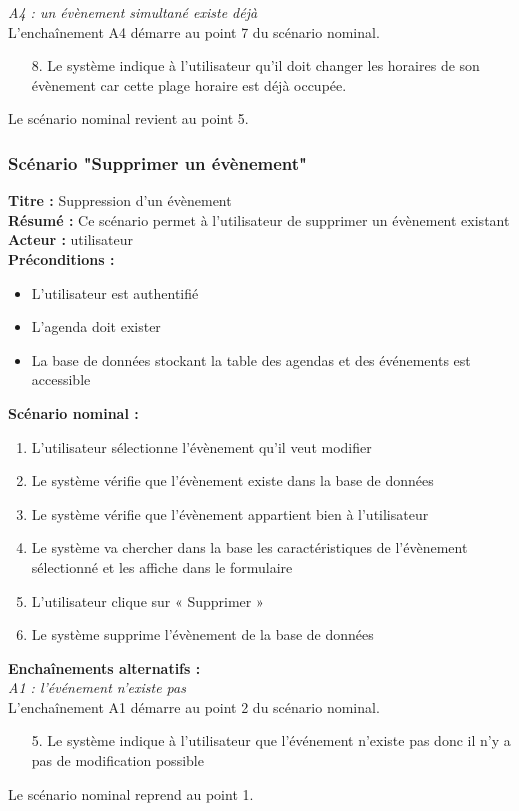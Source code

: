 \documentclass[12pt , a4paper]{article}
\begin{document}
\noindent\textit{A4 : un évènement simultané existe déjà}\\
L’enchaînement A4 démarre au point 7 du scénario nominal.
\begin{enumerate}
\item[8.] Le système indique à l’utilisateur qu’il doit changer les horaires de son évènement car cette plage horaire est déjà occupée.
\end{enumerate}
Le scénario nominal revient au point 5.\\




\newpage
\subsubsection{Scénario "Supprimer un évènement"}
\noindent\textbf{Titre : } Suppression d’un évènement\\
\textbf{Résumé : } Ce scénario permet à l’utilisateur de supprimer un évènement existant\\
\textbf{Acteur : }utilisateur\\

\noindent\textbf{Préconditions :}
\begin{itemize}
\item L’utilisateur est authentifié
\item L'agenda doit exister
\item La base de données stockant la table des agendas et des événements est accessible\\
\end{itemize}


\noindent\textbf{Scénario nominal :}
\begin{enumerate}
\item L’utilisateur sélectionne l’évènement qu’il veut modifier
\item Le système vérifie que l’évènement existe dans la base de données
\item Le système vérifie que l’évènement appartient bien à l’utilisateur
\item Le système va chercher dans la base les caractéristiques de l’évènement sélectionné et les affiche dans le formulaire
\item L’utilisateur clique sur « Supprimer »
\item Le système supprime l’évènement  de la base de données\\
\end{enumerate}

\noindent\textbf{Encha\^inements alternatifs :}\\
\noindent\textit{A1 : l’événement n’existe pas}\\
L'encha\^inement A1 démarre au point 2 du scénario nominal.
\begin{enumerate}
\item[5.] Le système indique à l’utilisateur que l’événement n’existe pas donc il n’y a pas de modification possible
\end{enumerate}
Le scénario nominal reprend au point 1.\\
\end{document}
